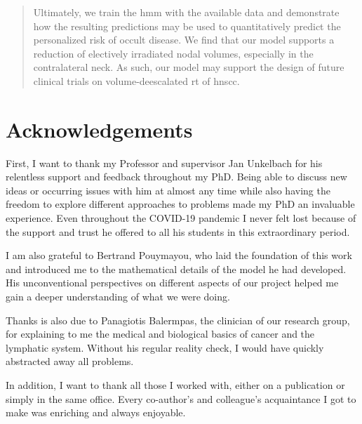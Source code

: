 \documentclass[\relativeRoot/main.tex]{subfiles}
\begin{document}
\begin{abstract}
    Ultimately, we train the \gls{hmm} with the available data and demonstrate how the resulting predictions may be used to quantitatively predict the personalized risk of occult disease. We find that our model supports a reduction of electively irradiated nodal volumes, especially in the contralateral neck. As such, our model may support the design of future clinical trials on volume-deescalated \acrlong{rt} of \gls{hnscc}.
\end{abstract}



\chapter*{Acknowledgements}
First, I want to thank my Professor and supervisor Jan Unkelbach for his relentless support and feedback throughout my PhD. Being able to discuss new ideas or occurring issues with him at almost any time while also having the freedom to explore different approaches to problems made my PhD an invaluable experience. Even throughout the COVID-19 pandemic I never felt lost because of the support and trust he offered to all his students in this extraordinary period.

I am also grateful to Bertrand Pouymayou, who laid the foundation of this work and introduced me to the mathematical details of the model he had developed. His unconventional perspectives on different aspects of our project helped me gain a deeper understanding of what we were doing.

Thanks is also due to Panagiotis Balermpas, the clinician of our research group, for explaining to me the medical and biological basics of cancer and the lymphatic system. Without his regular reality check, I would have quickly abstracted away all problems.

In addition, I want to thank all those I worked with, either on a publication or simply in the same office. Every co-author's and colleague's acquaintance I got to make was enriching and always enjoyable.
\end{document}
